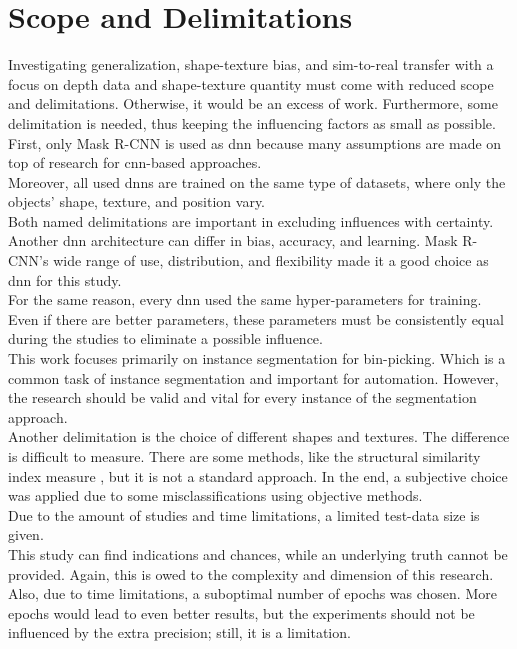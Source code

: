 	\section{Scope and Delimitations}
	\label{sec:scope-and-delimitations}
		Investigating generalization, shape-texture bias, and sim-to-real transfer with a focus on depth data and shape-texture quantity must come with reduced scope and delimitations. Otherwise, it would be an excess of work. Furthermore, some delimitation is needed, thus keeping the influencing factors as small as possible.\\
		First, only Mask R-CNN \cite{Kaiming2017} is used as \ac{dnn} because many assumptions are made on top of research for \ac{cnn}-based approaches.\\
		Moreover, all used \ac{dnn}s are trained on the same type of datasets, where only the objects' shape, texture, and position vary.\\
		Both named delimitations are important in excluding influences with certainty. Another \ac{dnn} architecture can differ in bias, accuracy, and learning. Mask R-CNN's wide range of use, distribution, and flexibility made it a good choice as \ac{dnn} for this study.\\
		For the same reason, every \ac{dnn} used the same hyper-parameters for training. Even if there are better parameters, these parameters must be consistently equal during the studies to eliminate a possible influence.\\
		This work focuses primarily on instance segmentation for bin-picking. Which is a common task of instance segmentation and important for automation\cite{Raj2023}\cite{Danielczuk2019}\cite{Xie2021}. However, the research should be valid and vital for every instance of the segmentation approach.\\
		Another delimitation is the choice of different shapes and textures. The difference is difficult to measure. There are some methods, like the structural similarity index measure \cite{Wang2004}, but it is not a standard approach. In the end, a subjective choice was applied due to some misclassifications using objective methods.
		\\
		Due to the amount of studies and time limitations, a limited test-data size is given.\\
		This study can find indications and chances, while an underlying truth cannot be provided. Again, this is owed to the complexity and dimension of this research.\\
		Also, due to time limitations, a suboptimal number of epochs was chosen. More epochs would lead to even better results, but the experiments should not be influenced by the extra precision; still, it is a limitation.
